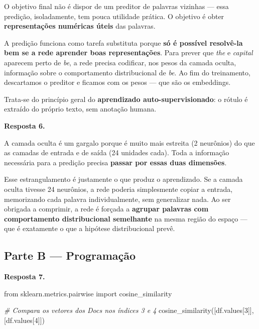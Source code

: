 \documentclass[
  brazilian,
]{article}
\newenvironment{Shaded}{}{}
\newcommand{\CommentTok}[1]{\textcolor[rgb]{0.38,0.63,0.69}{\textit{#1}}}
\newcommand{\DecValTok}[1]{\textcolor[rgb]{0.25,0.63,0.44}{#1}}
\newcommand{\ImportTok}[1]{#1}
\newcommand{\NormalTok}[1]{#1}
\begin{document}
O objetivo final não é dispor de um preditor de palavras vizinhas ---
essa predição, isoladamente, tem pouca utilidade prática. O objetivo é
obter \textbf{representações numéricas úteis} das palavras.

A predição funciona como tarefa substituta porque \textbf{só é possível
resolvê-la bem se a rede aprender boas representações}. Para prever que
\emph{the} e \emph{capital} aparecem perto de \emph{be}, a rede precisa
codificar, nos pesos da camada oculta, informação sobre o comportamento
distribucional de \emph{be}. Ao fim do treinamento, descartamos o
preditor e ficamos com os pesos --- que são os embeddings.

Trata-se do princípio geral do \textbf{aprendizado auto-supervisionado}:
o rótulo é extraído do próprio texto, sem anotação humana.

\textbf{Resposta 6.}

A camada oculta é um gargalo porque é muito mais estreita (2 neurônios)
do que as camadas de entrada e de saída (24 unidades cada). Toda a
informação necessária para a predição precisa \textbf{passar por essas
duas dimensões}.

Esse estrangulamento é justamente o que produz o aprendizado. Se a
camada oculta tivesse 24 neurônios, a rede poderia simplesmente copiar a
entrada, memorizando cada palavra individualmente, sem generalizar nada.
Ao ser obrigada a comprimir, a rede é forçada a \textbf{agrupar palavras
com comportamento distribucional semelhante} na mesma região do espaço
--- que é exatamente o que a hipótese distribucional prevê.

\hypertarget{parte-b-programauxe7uxe3o}{%
\subsection{Parte B --- Programação}\label{parte-b-programauxe7uxe3o}}

\textbf{Resposta 7.}

\begin{Shaded}
\begin{Highlighting}[]
\ImportTok{from}\NormalTok{ sklearn.metrics.pairwise }\ImportTok{import}\NormalTok{ cosine\_similarity}

\CommentTok{\# Compara os vetores dos Docs nos índices 3 e 4}
\NormalTok{cosine\_similarity([df.values[}\DecValTok{3}\NormalTok{]], [df.values[}\DecValTok{4}\NormalTok{]])}
\end{Highlighting}
\end{Shaded}
\end{document}
